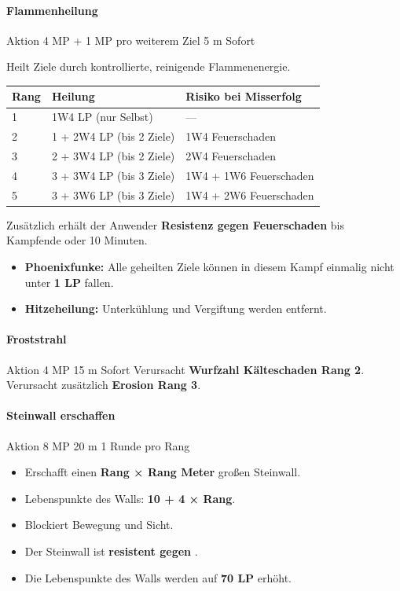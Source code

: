 \paragraph*{Flammenheilung}
\spellcard
{}
{Aktion}
{4 MP + 1 MP pro weiterem Ziel}
{5 m}
{Sofort}
{
	Heilt Ziele durch kontrollierte, reinigende Flammenenergie.
	
	\begin{center}
		\begin{tabular}{p{1cm}p{7cm}p{5cm}}
			\toprule
			\textbf{Rang} & \textbf{Heilung} & \textbf{Risiko bei Misserfolg} \\
			\midrule
			1 & 1W4 LP (nur Selbst) & — \\
			2 & 1 + 2W4 LP (bis 2 Ziele) & 1W4 Feuerschaden \\
			3 & 2 + 3W4 LP (bis 2 Ziele) & 2W4 Feuerschaden \\
			4 & 3 + 3W4 LP (bis 3 Ziele) & 1W4 + 1W6 Feuerschaden \\
			5 & 3 + 3W6 LP (bis 3 Ziele) & 1W4 + 2W6 Feuerschaden \\
			\bottomrule
		\end{tabular}
	\end{center}
	
	Zusätzlich erhält der Anwender \textbf{Resistenz gegen Feuerschaden}
	bis Kampfende oder 10 Minuten.
}
{
	\begin{itemize}
		\item \textbf{Phoenixfunke:} Alle geheilten Ziele können in diesem Kampf
		einmalig nicht unter \textbf{1 LP} fallen.
		\item \textbf{Hitzeheilung:} Unterkühlung und Vergiftung werden entfernt.
	\end{itemize}
}

\paragraph*{Froststrahl}
\spellcard
{}
{Aktion}
{4 MP}
{15 m}
{Sofort}
{
	Verursacht \textbf{Wurfzahl Kälteschaden Rang 2}.
}
{
	Verursacht zusätzlich \textbf{Erosion Rang 3}.
}

\paragraph*{Steinwall erschaffen}
\spellcard
{}
{Aktion}
{8 MP}
{20 m}
{1 Runde pro Rang}
{
	\begin{itemize}
		\item Erschafft einen \textbf{Rang × Rang Meter} großen Steinwall.
		\item Lebenspunkte des Walls: \textbf{10 + 4 × Rang}.
		\item Blockiert Bewegung und Sicht.
	\end{itemize}
}
{
	\begin{itemize}
		\item Der Steinwall ist \textbf{resistent gegen }.
		\item Die Lebenspunkte des Walls werden auf \textbf{70 LP} erhöht.
	\end{itemize}
}

